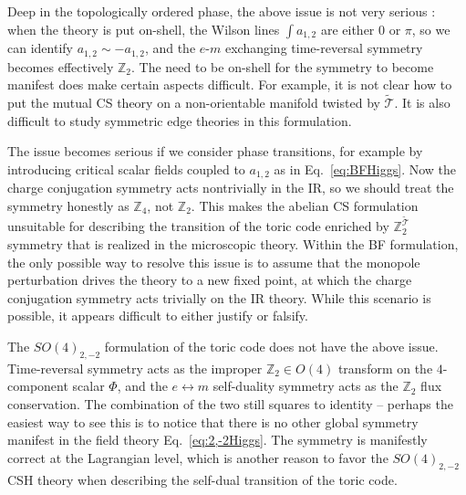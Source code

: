 \documentclass[aps, prl, superscriptaddress, twocolumn,
notitlepage, longbibliography,
floatfix]{revtex4-2}
\newcommand{\1}{\text{\uppercase\expandafter{\romannumeral1}}}
\newcommand{\2}{\text{\uppercase\expandafter{\romannumeral2}}}
\newcommand{\3}{\text{\uppercase\expandafter{\romannumeral3}}}
\newcommand{\4}{\text{\uppercase\expandafter{\romannumeral4}}}
\newcommand{\5}{\text{\uppercase\expandafter{\romannumeral5}}}
\newcommand{\6}{\text{\uppercase\expandafter{\romannumeral6}}}
\def\Z{\mathbb{Z}}
\begin{document}
Deep in the topologically ordered phase, the above issue is not very serious \cite{SeibergWitten2016,DualityWeb,GomisQuantumSymmetry}: when the theory is put on-shell, the Wilson lines $\int a_{1,2}$ are either $0$ or $\pi$, so we can identify $a_{1,2}\sim -a_{1,2}$, and the $e$-$m$ exchanging time-reversal symmetry becomes effectively $\Z_2$. The need to be on-shell for the symmetry to become manifest does make certain aspects difficult. For example, it is not clear how to put the mutual CS theory on a non-orientable manifold twisted by $\tilde{\mathcal{T}}$. It is also difficult to study symmetric edge theories \cite{LevinStern2012} in this formulation.

The issue becomes serious if we consider phase transitions, for example by introducing critical scalar fields coupled to $a_{1,2}$ as in Eq.~\eqref{eq:BFHiggs}. Now the charge conjugation symmetry acts nontrivially in the IR, so we should treat the symmetry honestly as $\Z_4$, not $\Z_2$. This makes the abelian CS formulation unsuitable for describing the transition of the toric code enriched by $\mathbb{Z}_2^{\tilde{\mathcal{T}}}$ symmetry that is realized in the microscopic theory. Within the BF formulation, the only possible way to resolve this issue is to assume that the monopole perturbation drives the theory to a new fixed point, at which the charge conjugation symmetry acts trivially on the IR theory. While this scenario is possible, it appears difficult to either justify or falsify.


The $SO(4)_{2,-2}$ formulation of the toric code does not have the above issue. Time-reversal symmetry acts as the improper $\Z_2\in O(4)$ transform on the $4$-component scalar $\Phi$, and the $e\leftrightarrow m$ self-duality symmetry acts as the $\Z_2$ flux conservation. The combination of the two still squares to identity -- perhaps the easiest way to see this is to notice that there is no other global symmetry manifest in the field theory Eq.~\eqref{eq:2,-2Higgs}. The symmetry is manifestly correct at the Lagrangian level, which is another reason to favor the $SO(4)_{2,-2}$ CSH theory when describing the self-dual transition of the toric code.
\end{document}
